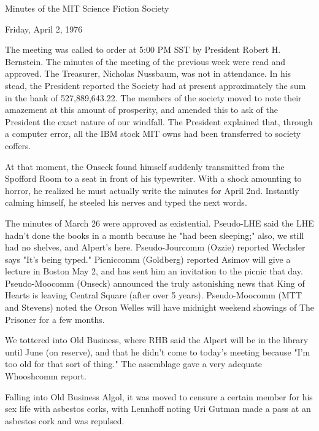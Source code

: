\documentclass[12pt]{article}
\begin{document}
\begin{center}

Minutes of the MIT Science Fiction Society

Friday, April 2, 1976

\end{center}
 
\vspace{12pt}

\setlength{\parskip}{6pt}

\noindent
The meeting was called to order at 5:00 PM SST by President Robert H. Bernstein. The minutes of the meeting of the previous week were read and approved. The Treasurer, Nicholas Nussbaum, was not in attendance. In his stead, the President reported the Society had at present approximately the sum in the bank of 527,889,643.22. The members of the society moved to note their amazement at this amount of prosperity, and amended this to ask of the President the exact nature of our windfall. The President explained that, through a computer error, all the IBM stock MIT owns had been transferred to society coffers.

At that moment, the Onseck found himself suddenly transmitted from the Spofford Room to a seat in front of his typewriter. With a shock amounting to horror, he realized he must actually write the minutes for April 2nd. Instantly calming himself, he steeled his nerves and typed the next words.

The minutes of March 26 were approved as existential. Pseudo-LHE said the LHE hadn't done the books in a month because he "had been sleeping;" also, we still had no shelves, and Alpert's here. Pseudo-Jourcomm (Ozzie) reported Wechsler says "It's being typed." Picniccomm (Goldberg) reported Asimov will give a lecture in Boston May 2, and has sent him an invitation to the picnic that day. Pseudo-Moocomm (Onseck) announced the truly astonishing news that King of Hearts is leaving Central Square (after over 5 years). Pseudo-Moocomm (MTT and Stevens) noted the Orson Welles will have midnight weekend showings of The Prisoner for a few months.

We tottered into Old Business, where RHB said the Alpert will be in the library until June (on reserve), and that he didn't come to today's meeting because "I'm too old for that sort of thing." The assemblage gave a very adequate Whooshcomm report.

Falling into Old Business Algol, it was moved to censure a certain member for his sex life with asbestos corks, with Lennhoff noting Uri Gutman made a pass at an asbestos cork and was repulsed.
\end{document}
